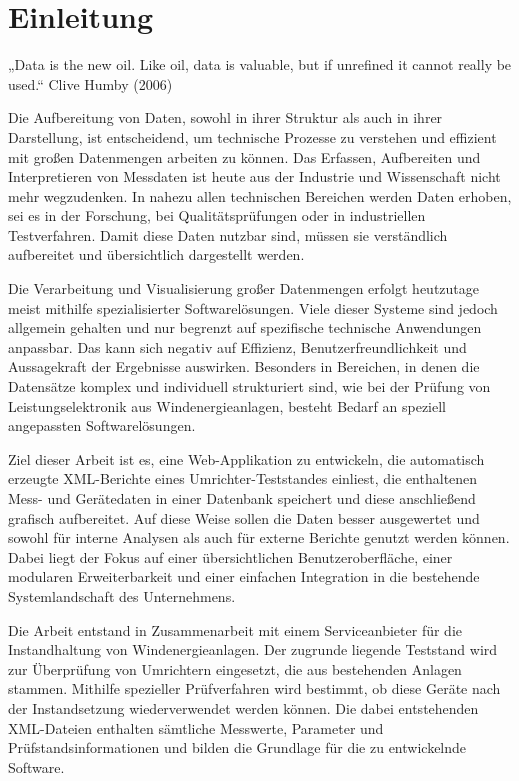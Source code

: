 


\newpage
\section{Einleitung}
\label{sec:einleitung}

„Data is the new oil. Like oil, data is valuable, but if unrefined it cannot really be used.“
Clive Humby (2006)

Die Aufbereitung von Daten, sowohl in ihrer Struktur als auch in ihrer Darstellung, ist entscheidend, um technische Prozesse zu verstehen und effizient mit großen Datenmengen arbeiten zu können.
Das Erfassen, Aufbereiten und Interpretieren von Messdaten ist heute aus der Industrie und Wissenschaft nicht mehr wegzudenken.
In nahezu allen technischen Bereichen werden Daten erhoben, sei es in der Forschung, bei Qualitätsprüfungen oder in industriellen Testverfahren.
Damit diese Daten nutzbar sind, müssen sie verständlich aufbereitet und übersichtlich dargestellt werden.

Die Verarbeitung und Visualisierung großer Datenmengen erfolgt heutzutage meist mithilfe spezialisierter Softwarelösungen.
Viele dieser Systeme sind jedoch allgemein gehalten und nur begrenzt auf spezifische technische Anwendungen anpassbar.
Das kann sich negativ auf Effizienz, Benutzerfreundlichkeit und Aussagekraft der Ergebnisse auswirken.
Besonders in Bereichen, in denen die Datensätze komplex und individuell strukturiert sind, wie bei der Prüfung von Leistungselektronik aus Windenergieanlagen, besteht Bedarf an speziell angepassten Softwarelösungen.

Ziel dieser Arbeit ist es, eine Web-Applikation zu entwickeln, die automatisch erzeugte XML-Berichte eines Umrichter-Teststandes einliest, die enthaltenen Mess- und Gerätedaten in einer Datenbank speichert und diese anschließend grafisch aufbereitet.
Auf diese Weise sollen die Daten besser ausgewertet und sowohl für interne Analysen als auch für externe Berichte genutzt werden können.
Dabei liegt der Fokus auf einer übersichtlichen Benutzeroberfläche, einer modularen Erweiterbarkeit und einer einfachen Integration in die bestehende Systemlandschaft des Unternehmens.

Die Arbeit entstand in Zusammenarbeit mit einem Serviceanbieter für die Instandhaltung von Windenergieanlagen.
Der zugrunde liegende Teststand wird zur Überprüfung von Umrichtern eingesetzt, die aus bestehenden Anlagen stammen.
Mithilfe spezieller Prüfverfahren wird bestimmt, ob diese Geräte nach der Instandsetzung wiederverwendet werden können.
Die dabei entstehenden XML-Dateien enthalten sämtliche Messwerte, Parameter und Prüfstandsinformationen und bilden die Grundlage für die zu entwickelnde Software.

